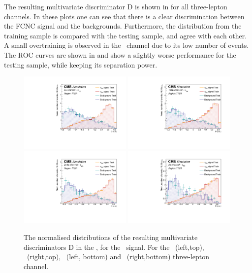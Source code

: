\clearpage

The resulting multivariate discriminator D is shown in  for all three-lepton channels. In these plots one can see that there is a clear discrimination between the FCNC signal and the backgrounds. Furthermore, the distribution from the training sample is compared with the testing sample, and  agree with each other. A small overtraining is observed in the \eee\ channel due to its low number of events. The ROC curves are shown in  and show a slightly worse performance for the testing sample, while keeping its separation power. 
\begin{figure}[htbp]
	\centering
	\includegraphics[width=0.49\textwidth]{6_Search/Figures/PlotsTechnics/SigVsBkgTestZcttoppairuuu}
	\includegraphics[width=0.49\textwidth]{6_Search/Figures/PlotsTechnics/SigVsBkgTestZcttoppairuue}
	\includegraphics[width=0.49\textwidth]{6_Search/Figures/PlotsTechnics/SigVsBkgTestZcttoppaireeu}
	\includegraphics[width=0.49\textwidth]{6_Search/Figures/PlotsTechnics/SigVsBkgTestZcttoppaireee}
	\caption{The normalised distributions of the resulting  multivariate discriminators D in the \TTSR, for the \Zct\ signal. For the \mumumu\ (left,top), \emumu\ (right,top), \eemu\ (left, bottom) and \eee\ (right,bottom) three-lepton channel.}
	\label{fig:sigvsbkgtestzcttoppaire}
\end{figure}

